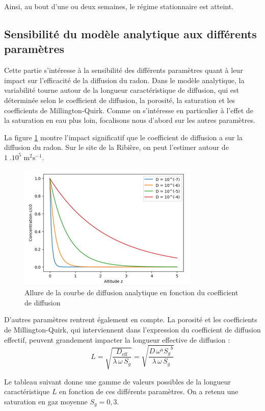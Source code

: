 \documentclass{article}
\begin{document}
Ainsi, au bout d'une ou deux semaines, le régime stationnaire est atteint.

\subsection{Sensibilité du modèle analytique aux différents paramètres}
\label{annexe:sens_analytique}

Cette partie s'intéresse à la sensibilité des différents paramètres quant à leur impact sur l'efficacité de la diffusion du radon. Dans le modèle analytique, la variabilité tourne autour de la longueur caractéristique de diffusion, qui est déterminée selon le coefficient de diffusion, la porosité, la saturation et les coefficients de Millington-Quirk. Comme on s'intéresse en particulier à l'effet de la saturation en eau plus loin, focalisons nous d'abord sur les autres paramètres.

La figure \ref{fig:sens_diffusion} montre l'impact significatif que le coefficient de diffusion a sur la diffusion du radon. Sur le site de la Ribière, on peut l'estimer autour de $1 \; .10^5 \; \text{m}^2 \text{s}^{-1}$.

\begin{figure}[H]
    \centering
    \includegraphics[width = 8 cm]{III_C_8.png}
    \caption{Allure de la courbe de diffusion analytique en fonction du coefficient de diffusion}
    \label{fig:sens_diffusion}
\end{figure}

D'autres paramètres rentrent également en compte. La porosité et les coefficients de Millington-Quirk, qui interviennent dans l’expression du coefficient de diffusion effectif, peuvent grandement impacter la longueur effective de diffusion :
$$
L=\sqrt{\frac{D_{\text{eff}}}{\lambda \,\omega\, S_g }}=\sqrt{\frac{D \,\omega^a {S_g}^b}{\lambda\, \omega \,S_g }}
$$

Le tableau suivant donne une gamme de valeurs possibles de la longueur caractéristique $L$ en fonction de ces différents paramètres. On a retenu une saturation en gaz moyenne $S_g=0,3$.
\end{document}
